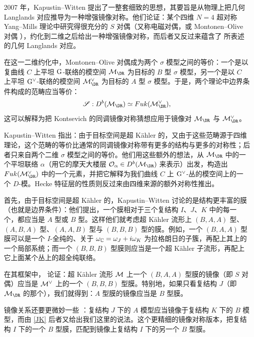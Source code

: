 2007 年，Kapustin--Witten \cite{kapustin-witten} 提出了一整套细致的思想，其要旨是从物理上把几何 Langlands 对应推导为一种增强镜像对称。他们论证：某个四维 $N=4$ 超对称 Yang--Mills 理论中研究得很充分的 $S$ 对偶（又称电磁对偶，或 Montonen--Olive 对偶 \cite{montonen-olive}），约化到二维之后给出一种增强镜像对称，而后者又反过来蕴含了 \cite{beilinson-drinfeld} 所表述的几何 Langlands 对应。

在这一二维约化中，Montonen--Olive 对偶成为两个 $\sigma$ 模型之间的等价：一个是以复曲线 $C$ 上平坦 $\mathrm{G}$-联络的模空间 $\M_\DR$ 为目标的 $B$ 型 $\sigma$ 模型，另一个是以 $C$ 上平坦 $\mathrm{G}^\vee$-联络的模空间 $\M^\vee_\DR$ 为目标的 $A$ 型 $\sigma$ 模型。于是，两个理论中边界条件构成的范畴应当等价：
\begin{equation}\label{hmsgl}
\mathscr{S}:D^b(\M_\DR)\simeq Fuk(\M_\DR^\vee),
\end{equation}
这可以解释为把 Kontsevich 的同调镜像对称猜想应用于镜像对 $\M_\DR$ 与 $\M_\DR^\vee$。

Kapustin--Witten \cite{kapustin-witten} 指出：由于目标空间是超 Kähler 的，又由于这些范畴源于四维理论，这个范畴的等价比通常的同调镜像对称带有更多的结构与更多的对称性；后者只来自两个二维 $\sigma$ 模型之间的等价。他们用这些额外的想法，从 $\M_\DR$ 中的一个平坦联络 $\alpha$（用它的摩天大楼层 $\calO_\alpha\in D^b(\M_\DR)$ 来表示）出发，构造出 $Fuk(\M^\vee_\DR)$ 中的一个元素，并把它解释为我们曲线 $C$ 上 $\mathrm{G}^\vee$-丛的模空间上的一个 $D$-模。Hecke 特征层的性质则反过来由四维来源的额外对称性推出。

首先，由于目标空间是超 Kähler 的，Kapustin--Witten 讨论的是结构更丰富的膜（也就是边界条件）：他们提出，一个膜相对于三个复结构 $I$、$J$、$K$ 中的每一个，都应当是 $A$ 型或 $B$ 型。这样他们就考虑超 Kähler 流形上 $(B,A,A)$ 型、$(A,B,A)$ 型、$(A,A,B)$ 型与 $(B,B,B)$ 型的膜。例如，一个 $(B,A,A)$ 型膜可以是一个 $I$-全纯的、关于 $\omega_{\mathbb{C}}=\omega_J+i\omega_K$ 为拉格朗日的子簇，再配上其上的一个局部系统；而一个 $(B,B,B)$ 型膜则应当是一个超 Kähler 子流形，再配上它上面某个丛上的超全纯联络。

在其框架中，\cite{kapustin-witten} 论证：超 Kähler 流形 ${\mathcal{M}}$ 上一个 $(B,A,A)$ 型膜的镜像（即 $S$ 对偶）应当是 ${\mathcal{M}}^\vee$ 上的一个 $(B,B,B)$ 型膜。特别地，如果只看复结构 $J$（即 $\M_{\DR}$ 的那个），我们就得到：$A$ 型膜的镜像应当是 $B$ 型膜。

镜像关系还要更微妙一些 \cite[Table 2 p74]{kapustin-witten}：复结构 $J$ 下的 $A$ 模型应当镜像于复结构 $K$ 下的 $B$ 模型，而由 \eqref{JK} 后者又给出我们这里的说法。这个更精细的镜像对称版本，把复结构 $I$ 下的一个 $B$ 型膜，匹配到镜像上复结构 $I$ 下的另一个 $B$ 型膜。

